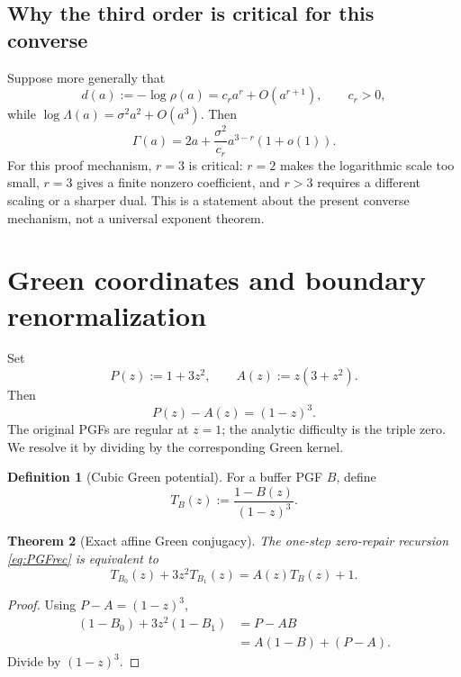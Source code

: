 \documentclass[11pt,a4paper]{article}
\newtheorem{theorem}{Theorem}[section]
\theoremstyle{definition}
\newtheorem{definition}[theorem]{Definition}
\theoremstyle{remark}
\begin{document}
\subsection{Why the third order is critical for this converse}

Suppose more generally that
\[
 d(a):=-\log\rho(a)=c_ra^r+O(a^{r+1}),
 \qquad c_r>0,
\]
while \(\log\Lambda(a)=\sigma^2a^2+O(a^3)\).  Then
\begin{equation}
 \Gamma(a)=2a+\frac{\sigma^2}{c_r}a^{3-r}(1+o(1)).
 \label{eq:criticality}
\end{equation}
For this proof mechanism, \(r=3\) is critical: \(r=2\) makes the logarithmic
scale too small, \(r=3\) gives a finite nonzero coefficient, and \(r>3\)
requires a different scaling or a sharper dual.  This is a statement about the
present converse mechanism, not a universal exponent theorem.

\section{Green coordinates and boundary renormalization}
\label{sec:green}

Set
\[
 P(z):=1+3z^2,
 \qquad
 A(z):=z(3+z^2).
\]
Then
\begin{equation}
 \boxed{P(z)-A(z)=(1-z)^3.}
 \label{eq:cubiczero}
\end{equation}
The original PGFs are regular at \(z=1\); the analytic difficulty is the
triple zero.  We resolve it by dividing by the corresponding Green kernel.

\begin{definition}[Cubic Green potential]
For a buffer PGF \(B\), define
\begin{equation}
 \boxed{
 T_B(z):=\frac{1-B(z)}{(1-z)^3}.
 }
 \label{eq:TB}
\end{equation}
\end{definition}

\begin{theorem}[Exact affine Green conjugacy]
The one-step zero-repair recursion \eqref{eq:PGFrec} is equivalent to
\begin{equation}
 \boxed{
 T_{B_0}(z)+3z^2T_{B_1}(z)=A(z)T_B(z)+1.
 }
 \label{eq:GreenRec}
\end{equation}
\end{theorem}

\begin{proof}
Using \(P-A=(1-z)^3\),
\begin{align*}
(1-B_0)+3z^2(1-B_1)
&=P-AB\\
&=A(1-B)+(P-A).
\end{align*}
Divide by \((1-z)^3\).
\end{proof}
\end{document}
